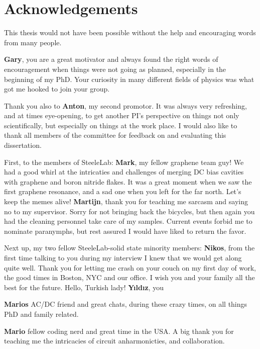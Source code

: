 \chapter*{Acknowledgements}
\label{acknowledgements}

This thesis would not have been possible without the help and encouraging words from many people.

\textbf{Gary}, you are a great motivator and always found the right words of encouragement when things were not going as planned, especially in the beginning of my PhD.
%
Your curiosity in many different fields of physics was what got me hooked to join your group.

Thank you also to \textbf{Anton}, my second promotor.
%
It was always very refreshing, and at times eye-opening, to get another PI's perspective on things not only scientifically, but especially on things at the work place.
%
I would also like to thank all members of the committee for feedback on and evaluating this dissertation.

First, to the members of SteeleLab:
%
\textbf{Mark}, my fellow graphene team guy!
%
We had a good whirl at the intricaties and challenges of merging DC bias cavities with graphene and boron nitride flakes.
%
It was a great moment when we saw the first graphene resonance, and a sad one when you left for the far north.
%
Let's keep the memes alive!
%
\textbf{Martijn}, thank you for teaching me sarcasm and saying no to my supervisor.
%
Sorry for not bringing back the bicycles, but then again you had the cleaning personnel take care of my samples.
%
Current events forbid me to nominate paranymphs, but rest assured I would have liked to return the favor.

Next up, my two fellow SteeleLab-solid state minority members:
%
\textbf{Nikos}, from the first time talking to you during my interview I knew that we would get along quite well.
%
Thank you for letting me crash on your couch on my first day of work, the good times in Boston, NYC and our office.
%
I wish you and your family all the best for the future.
%
Hello, Turkish lady!
%
\textbf{Yıldız}, you 

\textbf{Marios} AC/DC friend and great chats, during these crazy times, on all things PhD and family related.

\textbf{Mario} fellow coding nerd and great time in the USA.
%
A big thank you for teaching me the intricacies of circuit anharmonicties, and collaboration.

